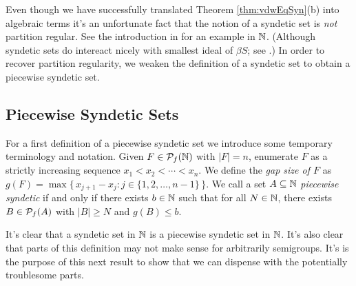 Even though we have successfully translated Theorem \ref{thm:vdwEqSyn}(b) into algebraic terms it's an unfortunate fact that the notion of a syndetic set is \emph{not} partition regular. 
See the introduction in \cite{Bergelson:2001ve} for an example in $\mathbb{N}$.
(Although syndetic sets do intereact nicely with smallest ideal of $\beta S$; see \cite[Theorems 4.39 and 4.43]{Hindman:1998fk}.)
In order to recover partition regularity, we weaken the definition of a syndetic set to obtain a piecewise syndetic set.

\subsection{Piecewise Syndetic Sets}
For a first definition of a piecewise syndetic set we introduce some temporary terminology and notation.
Given $F \in \mathcal{P}_f(\mathbb{N})$ with $|F| = n$, enumerate $F$ as a strictly increasing sequence $x_1 < x_2 < \cdots < x_n$. 
We define the \emph{gap size of $F$} as $g(F) = \max\bigr\{\, x_{j+1} - x_j : j \in \{1, 2, \ldots, n-1\} \,\bigl\}$.
We call a set $A \subseteq \mathbb{N}$ \emph{piecewise syndetic} if and only if there exists $b \in \mathbb{N}$ such that for all $N \in \mathbb{N}$, there exists $B \in \mathcal{P}_f(A)$ with $|B| \ge N$ and $g(B) \le b$.

It's clear that a syndetic set in $\mathbb{N}$ is a piecewise syndetic set in $\mathbb{N}$.
It's also clear that  parts of this definition may not make sense for arbitrarily semigroups.
It's is the purpose of this next result to show that we can dispense with the potentially troublesome parts.

